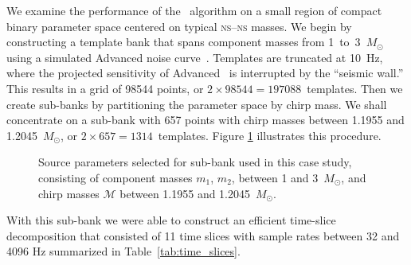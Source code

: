 We examine the performance of the \lloid\ algorithm on a small region of
compact binary parameter space centered on typical \textsc{ns}--\textsc{ns}
masses.  We begin by constructing a template bank that spans component masses
from 1~to~3~$M_\odot$ using a simulated Advanced \LIGO{} noise
curve~\citep{ALIGONoise}.  Templates are truncated at 10~Hz, where the projected
sensitivity of Advanced \LIGO\ is interrupted by the ``seismic wall.''
This results in a grid of 98544 points, or
$2 \times 98544 = 197088$~templates.  Then we create sub-banks by partitioning
the parameter space by chirp mass.  We shall concentrate on a sub-bank with 657 points with
chirp masses between 1.1955 and 1.2045~$M_\odot$, or $2 \times 657 = 1314$~templates.
Figure \ref{fig:tmpltbank} illustrates this procedure.
\begin{figure}[h]
	\caption{\label{fig:tmpltbank}Source parameters selected for sub-bank used in this
case study, consisting of component masses $m_1$, $m_2$, between 1 and 3~$M_\odot$, and
chirp masses $\mathcal{M}$ between 1.1955 and 1.2045~$M_\odot$.}
\end{figure}
With this sub-bank we were able to construct an efficient time-slice decomposition
that consisted of 11 time slices with sample rates between 32 and 4096 Hz summarized
in Table~\ref{tab:time_slices}.

